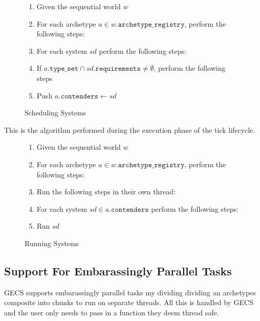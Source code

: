 \begin{figure}[H]
\begin{enumerate}
    \item Given the sequential world $w$
    \item For each archetype $a \in w.\texttt{archetype\_registry}$, perform the following steps:
    \item For each system $sd$ perform the following steps:
    \item If $a.\texttt{type\_set} \cap sd.\texttt{requirements} \not= \emptyset$, perform the following steps
    \item Push $a.\texttt{contenders} \leftarrow sd$
\end{enumerate}
\caption{Scheduling Systems}
\label{alg:schedule_fsm}
\end{figure}

This is the algorithm performed during the execution phase of the tick lifecycle.
\begin{figure}[H]
\begin{enumerate}
    \item Given the sequential world $w$
    \item For each archetype $a \in w.\texttt{archetype\_registry}$, perform the following steps:
    \item Run the following steps in their own thread:
    \item For each system $sd \in a.\texttt{contenders}$ perform the following steps:
    \item Run $sd$
\end{enumerate}
\caption{Running Systems}
\label{alg:run_fsm}
\end{figure}

\subsection{Support For Embarassingly Parallel Tasks}
GECS supports embarassingly parallel tasks my dividing dividing an archetypes composite into chunks to run on separate threads. All this is handled by GECS and the user only needs to pass in a function they deem thread safe.